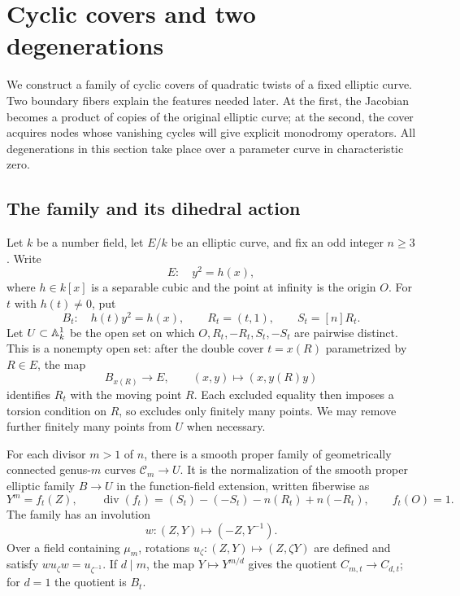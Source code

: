 \section{Cyclic covers and two degenerations}\label{sec:geometry}

We construct a family of cyclic covers of quadratic twists of a fixed
elliptic curve.  Two boundary fibers explain the features needed later.
At the first, the Jacobian becomes a product of copies of the original
elliptic curve; at the second, the cover acquires nodes whose vanishing
cycles will give explicit monodromy operators.  All degenerations in this
section take place over a parameter curve in characteristic zero.

\subsection{The family and its dihedral action}

Let $k$ be a number field, let $E/k$ be an elliptic curve, and fix an odd
integer $n\geq 3$.  Write
\[
 E:\quad y^2=h(x),
\]
where $h\in k[x]$ is a separable cubic and the point at infinity is the
origin $O$.  For $t$ with $h(t)\ne 0$, put
\begin{equation}\label{geo:twist}
 B_t:\quad h(t)y^2=h(x),\qquad R_t=(t,1),\qquad S_t=[n]R_t.
\end{equation}
Let $U\subset\mathbb A^1_k$ be the open set on which
$O,R_t,-R_t,S_t,-S_t$ are pairwise distinct.  This is a nonempty open set:
after the double cover $t=x(R)$ parametrized by $R\in E$, the map
\[
 B_{x(R)}\longrightarrow E,\qquad (x,y)\longmapsto (x,y(R)y)
\]
identifies $R_t$ with the moving point $R$.  Each excluded equality then
imposes a torsion condition on $R$, so excludes only finitely many points.
We may remove further finitely many points from $U$ when necessary.

\begin{lemma}\label{geo:family}
For each divisor $m>1$ of $n$, there is a smooth proper family of
geometrically connected genus-$m$ curves $\mathcal C_m\to U$.  It is
the normalization of the smooth proper elliptic family $B\to U$
in the function-field extension, written fiberwise as
\begin{equation}\label{geo:kummer}
 Y^m=f_t(Z),\qquad
 \operatorname{div}(f_t)=(S_t)-(-S_t)-n(R_t)+n(-R_t),\qquad f_t(O)=1.
\end{equation}
The family has an involution
\begin{equation}\label{geo:reflection}
 w:(Z,Y)\longmapsto(-Z,Y^{-1}).
\end{equation}
Over a field containing $\mu_m$, rotations $u_\zeta:(Z,Y)\mapsto(Z,\zeta Y)$
are defined and satisfy $wu_\zeta w=u_{\zeta^{-1}}$.
If $d\mid m$, the map $Y\mapsto Y^{m/d}$ gives the quotient
$C_{m,t}\to C_{d,t}$; for $d=1$ the quotient is $B_t$.
\end{lemma}

